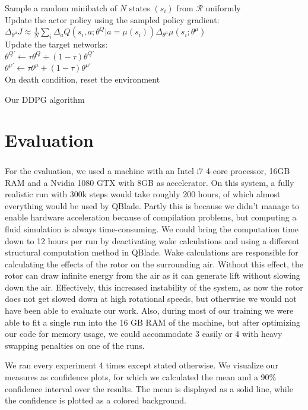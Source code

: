 \documentclass[hyperref,final,beleg]{cgvpub}
\begin{document}
\begin{algorithm}
{{    Sample a random minibatch of $N$ states $(s_i)$ from $\mathcal{R}$ uniformly\\
    Update the actor policy using the sampled policy gradient: $\Delta_{\theta^{\mu}} J \approx \frac{1}{N} \sum_{i} \Delta_a Q(s_i, a;\theta^Q | a=\mu(s_i)) \Delta_{\theta^{\mu}}\mu(s_i;\theta^{\mu})$\\
    Update the target networks:\\
    $\theta^{Q'} \leftarrow \tau \theta^{Q} + (1-\tau)\theta^{Q'}$\\
    $\theta^{\mu'} \leftarrow \tau \theta^{\mu} + (1-\tau)\theta^{\mu'}$\\
    On death condition, reset the environment
  }
}
\caption{Our DDPG algorithm}
\label{alg:ourddpg}
\end{algorithm}

\chapter{Evaluation}

For the evaluation, we used a machine with an Intel\textsuperscript{\textregistered} i7 4-core processor, 16GB RAM and a Nvidia 1080 GTX with 8GB as accelerator. On this system, a fully realistic run with 300k steps would take roughly 200 hours, of which almost everything would be used by QBlade. Partly this is because we didn't manage to enable hardware acceleration because of compilation problems, but computing a fluid simulation is always time-consuming. We could bring the computation time down to 12 hours per run by deactivating wake calculations and using a different structural computation method in QBlade. Wake calculations are responsible for calculating the effects of the rotor on the surrounding air. Without this effect, the rotor can draw infinite energy from the air as it can generate lift without slowing down the air. Effectively, this increased instability of the system, as now the rotor does not get slowed down at high rotational speeds, but otherwise we would not have been able to evaluate our work. Also, during most of our training we were able to fit a single run into the 16 GB RAM of the machine, but after optimizing our code for memory usage, we could accommodate 3 easily or 4 with heavy swapping penalties on one of the runs.

We ran every experiment 4 times except stated otherwise. We visualize our measures as confidence plots, for which we calculated the mean and a 90\% confidence interval over the results. The mean is displayed as a solid line, while the confidence is plotted as a colored background. 
\end{document}
